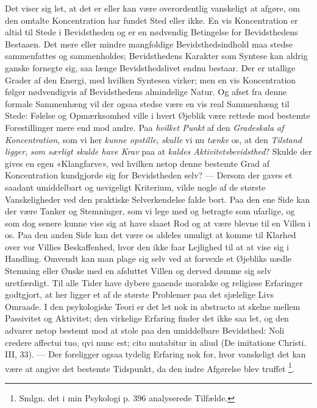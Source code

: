 \documentclass[12pt,a4paper,openany]{book}
\begin{document}
Det viser sig let, at det er eller kan være overordentlig vanskeligt at afgøre,
om den omtalte Koncentration har fundet Sted eller ikke. En vis Koncentration
er altid til Stede i Bevidstheden og er en nødvendig Betingelse for
Bevidsthedens Bestaaen. Det mere eller mindre mangfoldige Bevidsthedsindhold
maa stedse sammenfattes og sammenholdes; Bevidsthedens Karakter som Syntese kan
aldrig ganske fornegte sig, saa længe Bevidsthedslivet endnu bestaar. Der er
utallige Grader af den Energi, med hvilken Syntesen virker; men en vis
Koncentration følger nødvendigvis af Bevidsthedens almindelige Natur. Og afset
fra denne formale Sammenhæng vil der ogsaa stedse være en vis real Sammenhæng
til Stede: Følelse og Opmærksomhed ville i hvert Øjeblik være rettede mod
bestemte Forestillinger mere end mod andre. Paa \emph{hvilket Punkt} af den
\emph{Gradeskala af Koncentration}, som vi her \emph{kunne opstille},
\emph{skulle} vi nu \emph{tænke} os, at den \emph{Tilstand ligger}, \emph{som
særligt skulde have Krav} paa at \emph{kaldes Aktivitetsbevidsthed}? Skulde der
gives en egen «Klangfarve», ved hvilken netop denne bestemte Grad af
Koncentration kundgjorde sig for Bevidstheden selv? --- Dersom der gaves et
saadant umiddelbart og usvigeligt Kriterium, vilde nogle af de største
Vanskeligheder ved den praktiske Selverkendelse falde bort. Paa den ene Side
kan der være Tanker og Stemninger, som vi lege med og betragte som ufarlige, og
som dog senere kunne vise sig at have slaaet Rod og at være blevne til en
Villen i os. Paa den anden Side kan det være os aldeles umuligt at komme til
Klarhed over vor Villies Beskaffenhed, hvor den ikke faar Lejlighed til at at %
 vise sig i Handling. Omvendt kan man plage sig selv ved at forvexle et
Øjebliks uædle Stemning eller Ønske med en afsluttet Villen og derved dømme sig
selv uretfærdigt. Til alle Tider have dybere gaaende moralske og religiøse
Erfaringer godtgjort, at her ligger et af de største Problemer paa det
sjælelige Livs Omraade. I den psykologiske Teori er det let nok in abstracto at
skelne mellem Passivitet og Aktivitet; den virkelige Erfaring finder det ikke
saa let, og den advarer netop bestemt mod at stole paa den umiddelbare
Bevidsthed: Noli credere affectui tuo, qvi nunc est; cito mutabitur in aliud
(De imitatione Christi. III, 33). --- Der foreligger ogsaa tydelig Erfaring nok
for, hvor vanskeligt det kan være at angive det bestemte Tidspunkt, da den
indre Afgørelse blev truffet%
\footnote[1]{Smlgn. det i min Psykologi p. 396 analyserede Tilfælde.}.
\end{document}
